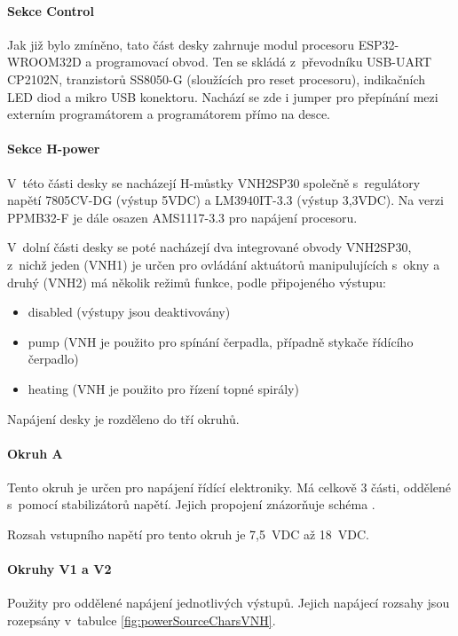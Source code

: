 \paragraph{Sekce Control}
Jak již bylo zmíněno, tato část desky zahrnuje modul procesoru ESP32-WROOM32D a programovací obvod. 
Ten se skládá z~převodníku USB-UART CP2102N, tranzistorů SS8050-G (sloužících pro reset procesoru), indikačních LED diod a mikro USB konektoru. 
Nachází se zde i jumper pro přepínání mezi externím programátorem a programátorem přímo na desce.

\paragraph{Sekce H-power}
V~této části desky se nacházejí H-můstky VNH2SP30 společně s~regulátory napětí 7805CV-DG (výstup 5VDC) a LM3940IT-3.3 (výstup 3,3VDC). 
Na verzi PPMB32-F je dále osazen AMS1117-3.3 pro napájení procesoru. 

V~dolní části desky se poté nacházejí dva integrované obvody VNH2SP30, z~nichž jeden (VNH1) je určen pro ovládání aktuátorů manipulujících s~okny a druhý 
(VNH2) má několik režimů funkce, podle připojeného výstupu:
\begin{itemize}
    \item disabled (výstupy jsou deaktivovány)
    \item pump (VNH je použito pro spínání čerpadla, případně stykače řídícího čerpadlo)
    \item heating (VNH je použito pro řízení topné spirály)
\end{itemize}

Napájení desky je rozděleno do tří okruhů. 

\paragraph{Okruh A}
\label{par:PowerCircuitA}
Tento okruh je určen pro napájení řídící elektroniky.
Má celkově 3 části, oddělené s~pomocí stabilizátorů napětí.
Jejich propojení znázorňuje schéma .

Rozsah vstupního napětí pro tento okruh je 7,5~VDC až 18~VDC.

\paragraph{Okruhy V1 a V2}
Použity pro oddělené napájení jednotlivých výstupů. 
Jejich napájecí rozsahy jsou rozepsány v~tabulce \ref{fig:powerSourceCharsVNH}.

